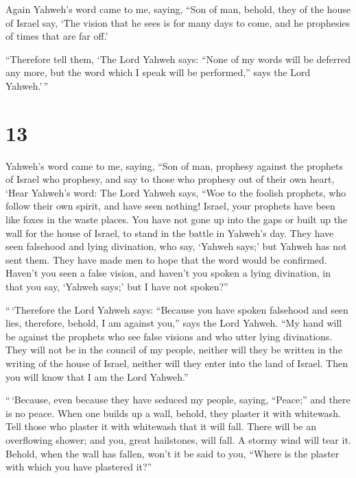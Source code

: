 Again Yahweh's word came to me, saying, 
``Son of man, behold, they of the house of Israel say, `The vision that
he sees is for many days to come, and he prophesies of times that are
far off.'

 ``Therefore tell them, `The Lord Yahweh says: ``None of
my words will be deferred any more, but the word which I speak will be
performed,'' says the Lord Yahweh.'\,''

\hypertarget{section-12}{%
\section{13}\label{section-12}}

 Yahweh's word came to me, saying,  ``Son of
man, prophesy against the prophets of Israel who prophesy, and say to
those who prophesy out of their own heart, `Hear Yahweh's word:
 The Lord Yahweh says, ``Woe to the foolish prophets, who
follow their own spirit, and have seen nothing!  Israel,
your prophets have been like foxes in the waste places. 
You have not gone up into the gaps or built up the wall for the house of
Israel, to stand in the battle in Yahweh's day.  They have
seen falsehood and lying divination, who say, `Yahweh says;' but Yahweh
has not sent them. They have made men to hope that the word would be
confirmed.  Haven't you seen a false vision, and haven't
you spoken a lying divination, in that you say, `Yahweh says;' but I
have not spoken?''

 ``\,`Therefore the Lord Yahweh says: ``Because you have
spoken falsehood and seen lies, therefore, behold, I am against you,''
says the Lord Yahweh.  ``My hand will be against the
prophets who see false visions and who utter lying divinations. They
will not be in the council of my people, neither will they be written in
the writing of the house of Israel, neither will they enter into the
land of Israel. Then you will know that I am the Lord Yahweh.''

 ``\,`Because, even because they have seduced my people,
saying, ``Peace;'' and there is no peace. When one builds up a wall,
behold, they plaster it with whitewash.  Tell those who
plaster it with whitewash that it will fall. There will be an
overflowing shower; and you, great hailstones, will fall. A stormy wind
will tear it.  Behold, when the wall has fallen, won't it
be said to you, ``Where is the plaster with which you have plastered
it?''

